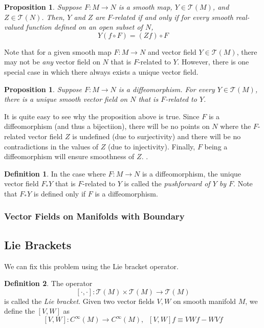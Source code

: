 \documentclass{article}
\newtheorem{proposition}[theorem]{Proposition}
\theoremstyle{remark}
\theoremstyle{definition}
\newtheorem{definition}{Definition}[section]
\begin{document}
\begin{proposition}
Suppose $F: M \longrightarrow N$ is a smooth map, $Y \in \mathcal{T}(M)$, and $Z \in \mathcal{T}(N)$. Then, $Y$ and $Z$ are $F$-related if and only if for every smooth real-valued function defined on an open subset of $N$, 
\[Y (f \circ F) = (Z f) \circ F\]
\end{proposition}

Note that for a given smooth map $F: M \longrightarrow N$ and vector field $Y \in \mathcal{T}(M)$, there may not be \textit{any} vector field on $N$ that is $F$-related to $Y$. However, there is one special case in which there always exists a unique vector field. 

\begin{proposition}
Suppose $F: M \longrightarrow N$ is a diffeomorphism. For every $Y \in \mathcal{T}(M)$, there is a unique smooth vector field on $N$ that is $F$-related to $Y$. 
\end{proposition}

It is quite easy to see why the proposition above is true. Since $F$ is a diffeomorphism (and thus a bijectiion), there will be no points on $N$ where the $F$-related vector field $Z$ is undefined (due to surjectivity) and there will be no contradictions in the values of $Z$ (due to injectivity). Finally, $F$ being a diffeomorphism will ensure smoothness of $Z$. . 

\begin{definition}
In the case where $F: M \longrightarrow N$ is a diffeomorphism, the unique vector field $F_* Y$ that is $F$-related to $Y$ is called the \textit{pushforward of $Y$ by $F$}. Note that $F_* Y$ is defined only if $F$ is a diffeomorphism.  
\end{definition}

\subsubsection{Vector Fields on Manifolds with Boundary}

\subsection{Lie Brackets}

We can fix this problem using the Lie bracket operator. 

\begin{definition}
The operator 
\[[\cdot, \cdot]: \mathcal{T}(M) \times \mathcal{T} (M) \longrightarrow \mathcal{T}(M)\]
is called the \textit{Lie bracket}. Given two vector fields $V, W$ on smooth manifold $M$, we define the $[V, W]$ as 
\[[V, W]: C^\infty(M) \longrightarrow C^\infty (M), \;\; [V, W] f \equiv V W f - W V f\]
\end{definition}
\end{document}
